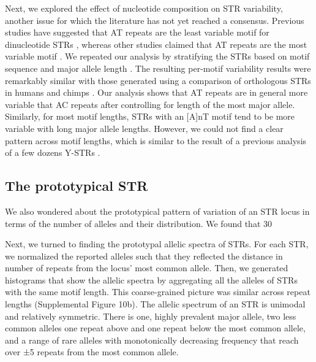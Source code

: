 Next, we explored the effect of nucleotide composition on STR variability, another issue for which the literature has not yet reached a consensus. Previous studies have suggested that AT repeats are the least variable motif for dinucleotide STRs \cite{PembertonSandefurJakobssonEtAl2009,BachtrogAgisImhofEtAl2000}, whereas other studies claimed that AT repeats are the most variable motif \cite{SunHelgasonMassonEtAl2012,KelkarTyekuchevaChiaromonteEtAl2008}. We repeated our analysis by stratifying the STRs based on motif sequence and major allele length \cite{SuppWillemsGymrekHighnamEtAl2014}. The resulting per-motif variability results were remarkably similar with those generated using a comparison of orthologous STRs in humans and chimps \cite{KelkarTyekuchevaChiaromonteEtAl2008}. Our analysis shows that AT repeats are in general more variable that AC repeats after controlling for length of the most major allele. Similarly, for most motif lengths, STRs with an [A]nT motif tend to be more variable with long major allele lengths. However, we could not find a clear pattern across motif lengths, which is similar to the result of a previous analysis of a few dozens Y-STRs \cite{BallantyneGoedbloedFangEtAl2010}. 

\subsection{The prototypical STR}
We also wondered about the prototypical pattern of variation of an STR locus in terms of the number of alleles and their distribution. We found that 30%

Next, we turned to finding the prototypal allelic spectra of STRs. For each STR, we normalized the reported alleles such that they reflected the distance in number of repeats from the locus' most common allele. Then, we generated histograms that show the allelic spectra by aggregating all the alleles of STRs with the same motif length. This coarse-grained picture was similar across repeat lengths (Supplemental Figure 10b).  The allelic spectrum of an STR is unimodal and relatively symmetric. There is one, highly prevalent major allele, two less common alleles one repeat above and one repeat below the most common allele, and a range of rare alleles with monotonically decreasing frequency that reach over ±5 repeats from the most common allele.  

